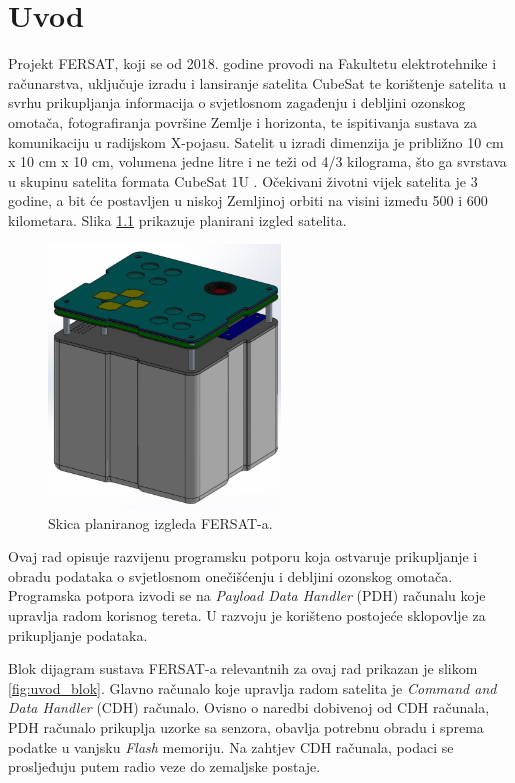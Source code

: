 \chapter{Uvod}
    Projekt FERSAT, koji se od 2018. godine provodi na Fakultetu elektrotehnike i računarstva, uključuje izradu i lansiranje satelita CubeSat te korištenje satelita u svrhu prikupljanja informacija o svjetlosnom zagađenju i debljini ozonskog omotača, fotografiranja površine Zemlje i horizonta, te ispitivanja sustava za komunikaciju u radijskom X-pojasu. Satelit u izradi dimenzija je približno 10 cm x 10 cm x 10 cm, volumena jedne litre i ne teži od 4/3 kilograma, što ga svrstava u skupinu satelita formata CubeSat 1U \cite{fersat_stranica_projekta}. Očekivani životni vijek satelita je 3 godine, a bit će postavljen u niskoj Zemljinoj orbiti na visini između 500 i 600 kilometara. Slika \ref{fig:fersat} prikazuje planirani izgled satelita.
    
    \begin{figure}[htb]
        \centering
        \includegraphics[height=7cm]{slike/fersat.png}
        \caption{Skica planiranog izgleda FERSAT-a. \cite{fersat_stranica_projekta}}
        \label{fig:fersat}
    \end{figure}

    Ovaj rad opisuje razvijenu programsku potporu koja ostvaruje prikupljanje i obradu podataka o svjetlosnom onečišćenju i debljini ozonskog omotača. Programska potpora izvodi se na \textit{Payload Data Handler} (PDH) računalu koje upravlja radom korisnog tereta. U razvoju je korišteno postojeće sklopovlje za prikupljanje podataka.

    Blok dijagram sustava FERSAT-a relevantnih za ovaj rad prikazan je slikom \ref{fig:uvod_blok}. Glavno računalo koje upravlja radom satelita je \textit{Command and Data Handler} (CDH) računalo. Ovisno o naredbi dobivenoj od CDH računala, PDH računalo prikuplja uzorke sa senzora, obavlja potrebnu obradu i sprema podatke u vanjsku \textit{Flash} memoriju. Na zahtjev CDH računala, podaci se prosljeđuju putem radio veze do zemaljske postaje.    
    
